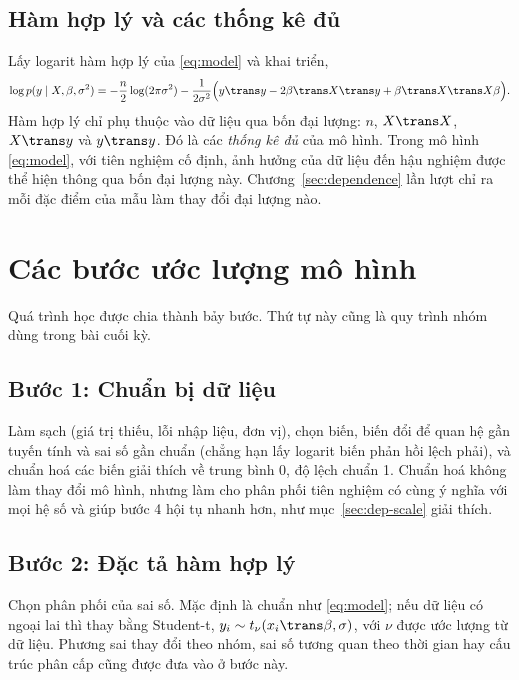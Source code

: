 \documentclass[12pt,a4paper]{report}
\begin{document}
\section{Hàm hợp lý và các thống kê đủ}
\label{sec:sufficient}

Lấy logarit hàm hợp lý của \eqref{eq:model} và khai triển,
%
\begin{equation}
  \label{eq:loglik}
  \log p(y \mid X, \beta, \sigma^2)
  = -\frac{n}{2}\log(2\pi\sigma^2)
    - \frac{1}{2\sigma^2}\Bigl( y\trans y - 2\beta\trans X\trans y
    + \beta\trans X\trans X \beta \Bigr).
\end{equation}
%
Hàm hợp lý chỉ phụ thuộc vào dữ liệu qua bốn đại lượng: $n$, $X\trans X$,
$X\trans y$ và $y\trans y$. Đó là các \emph{thống kê đủ} của mô hình. Trong mô hình \eqref{eq:model}, với tiên nghiệm cố định, ảnh hưởng của dữ liệu
đến hậu nghiệm được thể hiện thông qua bốn đại lượng này.
Chương~\ref{sec:dependence} lần lượt chỉ ra mỗi đặc điểm của mẫu làm thay đổi đại
lượng nào.

\chapter{Các bước ước lượng mô hình}
\label{sec:steps}

Quá trình học được chia thành bảy bước. Thứ tự này cũng là quy trình nhóm dùng
trong bài cuối kỳ.

\section{Bước 1: Chuẩn bị dữ liệu}
\label{sec:step-data}

Làm sạch (giá trị thiếu, lỗi nhập liệu, đơn vị), chọn biến, biến đổi để quan hệ
gần tuyến tính và sai số gần chuẩn (chẳng hạn lấy logarit biến phản hồi lệch
phải), và chuẩn hoá các biến giải thích về trung bình 0, độ lệch chuẩn 1. Chuẩn
hoá không làm thay đổi mô hình, nhưng làm cho phân phối tiên nghiệm có cùng ý nghĩa với mọi hệ
số và giúp bước 4 hội tụ nhanh hơn, như mục~\ref{sec:dep-scale} giải thích.

\section{Bước 2: Đặc tả hàm hợp lý}

Chọn phân phối của sai số. Mặc định là chuẩn như \eqref{eq:model}; nếu dữ liệu có
ngoại lai thì thay bằng Student-t,
$y_i \sim t_\nu(x_i\trans\beta, \sigma)$, với $\nu$ được ước lượng từ dữ liệu. Phương sai
thay đổi theo nhóm, sai số tương quan theo thời gian hay cấu trúc phân cấp cũng
được đưa vào ở bước này.
\end{document}
